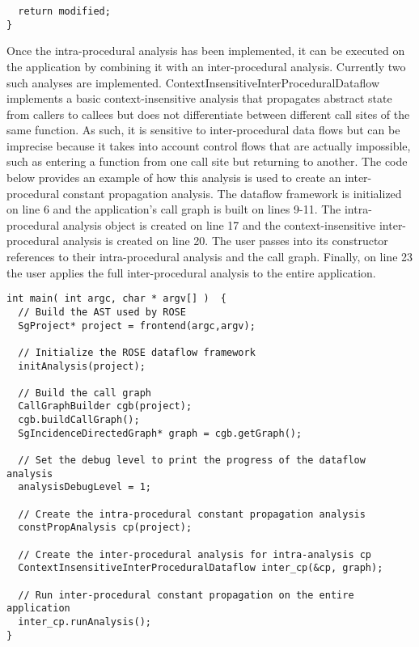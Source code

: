 {\begin{frame}
\begin{lstlisting}
  return modified;
}
\end{lstlisting}%
\end{frame}
Once the intra-procedural analysis has been implemented, it can be executed on the application by combining it with an inter-procedural analysis. Currently two such analyses are implemented. {\scriptsize ContextInsensitiveInterProceduralDataflow} implements a basic context-insensitive analysis that propagates abstract state from callers to callees but does not differentiate between different call sites of the same function. As such, it is sensitive to inter-procedural data flows but can be imprecise because it takes into account control flows that are actually impossible, such as entering a function from one call site but returning to another. The code below provides an example of how this analysis is used to create an inter-procedural constant propagation analysis. The dataflow framework is initialized on line 6 and the application’s call graph is built on lines 9-11. The intra-procedural analysis object is created on line 17 and the context-insensitive inter-procedural analysis is created on line 20. The user passes into its constructor references to their intra-procedural analysis and the call graph. Finally, on line 23 the user applies the full inter-procedural analysis to the entire application. 
 
\begin{frame}
\centering
\begin{lstlisting}
int main( int argc, char * argv[] )  {
  // Build the AST used by ROSE
  SgProject* project = frontend(argc,argv);
  
  // Initialize the ROSE dataflow framework
  initAnalysis(project);

  // Build the call graph
  CallGraphBuilder cgb(project);
  cgb.buildCallGraph();
  SgIncidenceDirectedGraph* graph = cgb.getGraph(); 

  // Set the debug level to print the progress of the dataflow analysis
  analysisDebugLevel = 1;
  
  // Create the intra-procedural constant propagation analysis
  constPropAnalysis cp(project);

  // Create the inter-procedural analysis for intra-analysis cp
  ContextInsensitiveInterProceduralDataflow inter_cp(&cp, graph);

  // Run inter-procedural constant propagation on the entire application
  inter_cp.runAnalysis();
}
\end{lstlisting}
\end{frame}

}
